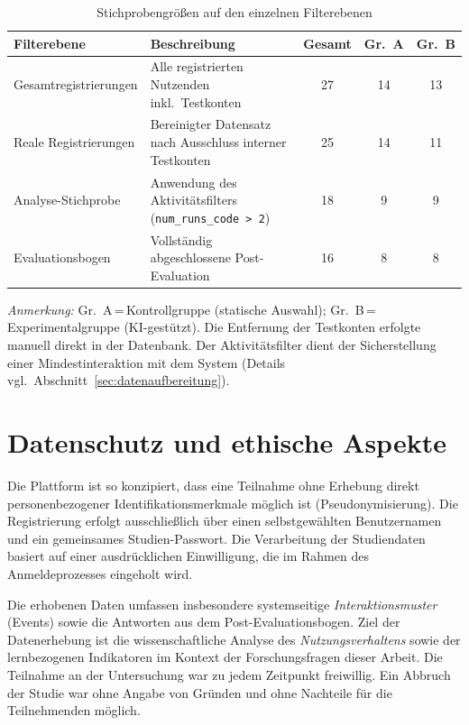 \begin{table}[ht]
  \centering
  \caption{Stichprobengrößen auf den einzelnen Filterebenen}
  \label{tab:stichprobe_ueberblick}
  \begin{tabular}{l p{6cm} ccc}
    \toprule
    \textbf{Filterebene} & \textbf{Beschreibung} & \textbf{Gesamt} & \textbf{Gr.~A} & \textbf{Gr.~B} \\
    \midrule
    Gesamtregistrierungen
      & Alle registrierten Nutzenden inkl.\ Testkonten
      & 27 & 14 & 13 \\
    Reale Registrierungen
      & Bereinigter Datensatz nach Ausschluss interner Testkonten
      & 25 & 14 & 11 \\
    Analyse-Stichprobe
      & Anwendung des Aktivitätsfilters (\texttt{num\_runs\_code > 2})
      & 18 & 9 & 9 \\ %
    Evaluationsbogen
      & Vollständig abgeschlossene Post-Evaluation
      & 16 & 8 & 8 \\
    \bottomrule
  \end{tabular}
  
  \vspace{0.2cm}
  \footnotesize
  \textit{Anmerkung:} Gr.~A\,=\,Kontrollgruppe (statische Auswahl); 
  Gr.~B\,=\,Experimentalgruppe (KI-gestützt). 
  Die Entfernung der Testkonten erfolgte manuell direkt in der Datenbank. 
  Der Aktivitätsfilter dient der Sicherstellung einer Mindestinteraktion mit dem System (Details vgl.\ Abschnitt~\ref{sec:datenaufbereitung}).
\end{table}

\section{Datenschutz und ethische Aspekte}\label{sec:datenschutz_ethik}

Die Plattform ist so konzipiert, dass eine Teilnahme ohne Erhebung direkt personenbezogener Identifikationsmerkmale möglich ist (Pseudonymisierung). Die Registrierung erfolgt ausschließlich über einen selbstgewählten Benutzernamen und ein gemeinsames Studien-Passwort. Die Verarbeitung der Studiendaten basiert auf einer ausdrücklichen Einwilligung, die im Rahmen des Anmeldeprozesses eingeholt wird.

Die erhobenen Daten umfassen insbesondere systemseitige \textit{Interaktionsmuster} (Events) sowie die Antworten aus dem Post-Evaluationsbogen. Ziel der Datenerhebung ist die wissenschaftliche Analyse des \textit{Nutzungsverhaltens} sowie der lernbezogenen Indikatoren im Kontext der Forschungsfragen dieser Arbeit. Die Teilnahme an der Untersuchung war zu jedem Zeitpunkt freiwillig. Ein Abbruch der Studie war ohne Angabe von Gründen und ohne Nachteile für die Teilnehmenden möglich.


